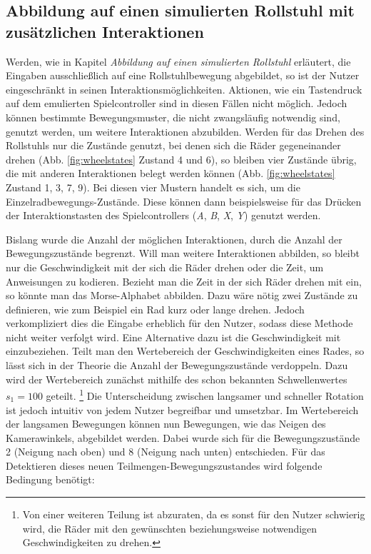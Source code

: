 \subsection{Abbildung auf einen simulierten Rollstuhl mit zusätzlichen Interaktionen}
Werden, wie in Kapitel \textit{Abbildung auf einen simulierten Rollstuhl} erläutert, die Eingaben ausschließlich auf eine Rollstuhlbewegung abgebildet, so ist der Nutzer eingeschränkt in seinen Interaktionsmöglichkeiten.
Aktionen, wie ein Tastendruck auf dem emulierten Spielcontroller sind in diesen Fällen nicht möglich.
Jedoch können bestimmte Bewegungsmuster, die nicht zwangsläufig notwendig sind, genutzt werden, um weitere Interaktionen abzubilden.
Werden für das Drehen des Rollstuhls nur die Zustände genutzt, bei denen sich die Räder gegeneinander drehen (Abb. \ref{fig:wheelstates} Zustand 4 und 6), so bleiben vier Zustände übrig, die mit anderen Interaktionen belegt werden können (Abb. \ref{fig:wheelstates} Zustand 1, 3, 7, 9).
Bei diesen vier Mustern handelt es sich, um die Einzelradbewegungs-Zustände.
Diese können dann beispielsweise für das Drücken der Interaktionstasten des Spielcontrollers (\textit{A}, \textit{B}, \textit{X}, \textit{Y}) genutzt werden.

Bislang wurde die Anzahl der möglichen Interaktionen, durch die Anzahl der Bewegungszustände begrenzt.
Will man weitere Interaktionen abbilden, so bleibt nur die Geschwindigkeit mit der sich die Räder drehen oder die Zeit, um Anweisungen zu kodieren.
Bezieht man die Zeit in der sich Räder drehen mit ein, so könnte man das Morse-Alphabet abbilden. Dazu wäre nötig zwei Zustände zu definieren, wie zum Beispiel ein Rad kurz oder lange drehen.
Jedoch verkompliziert dies die Eingabe erheblich für den Nutzer, sodass diese Methode nicht weiter verfolgt wird.
Eine Alternative dazu ist die Geschwindigkeit mit einzubeziehen.
Teilt man den Wertebereich der Geschwindigkeiten eines Rades, so lässt sich in der Theorie die Anzahl der Bewegungszustände verdoppeln.
Dazu wird der Wertebereich zunächst mithilfe des schon bekannten Schwellenwertes $s_1=100$ geteilt.
\footnote{Von einer weiteren Teilung ist abzuraten, da es sonst für den Nutzer schwierig wird, die Räder mit den gewünschten beziehungsweise notwendigen Geschwindigkeiten zu drehen.}
Die Unterscheidung zwischen langsamer und schneller Rotation ist jedoch intuitiv von jedem Nutzer begreifbar und umsetzbar.
Im Wertebereich der langsamen Bewegungen können nun Bewegungen, wie das Neigen des Kamerawinkels, abgebildet werden.
Dabei wurde sich für die Bewegungszustände 2 (Neigung nach oben) und 8 (Neigung nach unten) entschieden.
Für das Detektieren dieses neuen Teilmengen-Bewegungszustandes wird folgende Bedingung benötigt:

